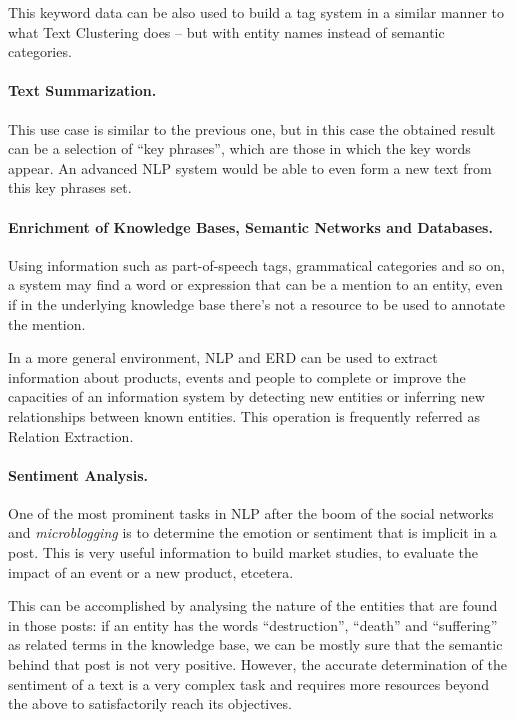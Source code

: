 This keyword data can be also used to build a tag system in a similar manner to what Text Clustering does -- but with entity names instead of semantic categories.

\paragraph{Text Summarization.}

This use case is similar to the previous one, but in this case the obtained result can be a selection of ``key phrases'', which are those in which the key words appear. An advanced NLP system would be able to even form a new text from this key phrases set.

\paragraph{Enrichment of Knowledge Bases, Semantic Networks and Databases.}

Using information such as part-of-speech tags, grammatical categories and so on, a system may find a word or expression that can be a mention to an entity, even if in the underlying knowledge base there's not a resource to be used to annotate the mention.

In a more general environment, NLP and ERD can be used to extract information about products, events and people to complete or improve the capacities of an information system by detecting new entities or inferring new relationships between known entities. This operation is frequently referred as Relation Extraction.

\paragraph{Sentiment Analysis.}

One of the most prominent tasks in NLP after the boom of the social networks and \emph{microblogging} is to determine the emotion or sentiment that is implicit in a post. This is very useful information to build market studies, to evaluate the impact of an event or a new product, etcetera.

This can be accomplished by analysing the nature of the entities that are found in those posts: if an entity has the words ``destruction'', ``death'' and ``suffering'' as related terms in the knowledge base, we can be mostly sure that the semantic behind that post is not very positive. However, the accurate determination of the sentiment of a text is a very complex task and requires more resources beyond the above to satisfactorily reach its objectives.


